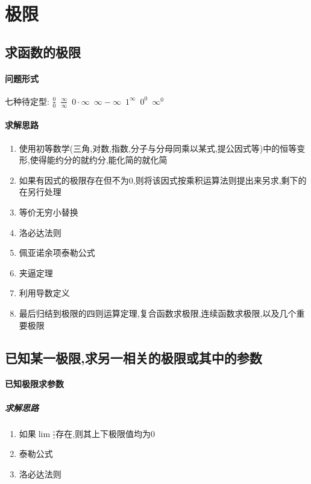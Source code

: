 \section{极限}
\subsection{求函数的极限}
    \paragraph{问题形式}
        七种待定型: $\frac{0}{0}$\ $ \frac{\infty}{\infty}$\ $ 0\cdot\infty  $\ $\infty - \infty$\ $  1^\infty $\ $ 0^0$\ $ \infty^0 $
    \paragraph{求解思路}
        \begin{enumerate}
            \item 使用初等数学(三角,对数,指数,分子与分母同乘以某式,提公因式等)中的恒等变形,使得能约分的就约分,能化简的就化简
            \item 如果有因式的极限存在但不为0,则将该因式按乘积运算法则提出来另求,剩下的在另行处理
            \item 等价无穷小替换
            \item 洛必达法则
            \item 佩亚诺余项泰勒公式
            \item 夹逼定理
            \item 利用导数定义
            \item 最后归结到极限的四则运算定理,复合函数求极限,连续函数求极限,以及几个重要极限
        \end{enumerate} 
    
\subsection{已知某一极限,求另一相关的极限或其中的参数}
    \paragraph{已知极限求参数}
    \subparagraph{求解思路}      
    \begin{enumerate}
        \item 如果$\lim\frac{\square}{\square}$存在,则其上下极限值均为0
        \item 泰勒公式
        \item 洛必达法则
    \end{enumerate}
